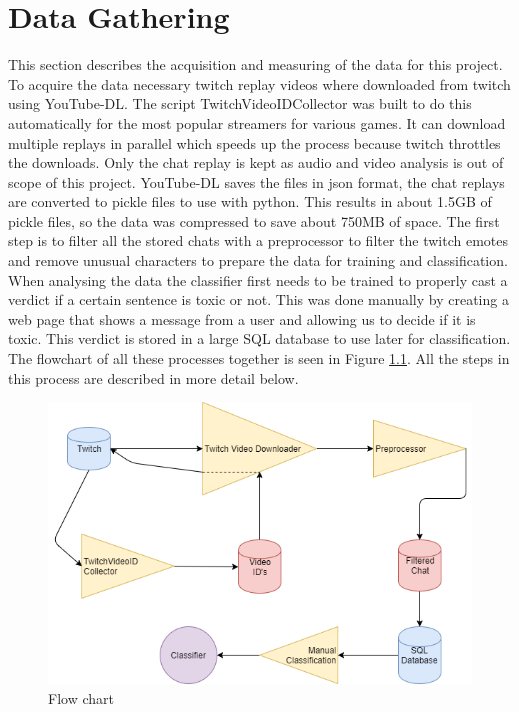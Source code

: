 \documentclass[final]{report}
\begin{document}
\chapter{Data Gathering}
\label{ch:datagathering}

This section describes the acquisition and measuring of the data for this project.
To acquire the data necessary twitch replay videos where downloaded from twitch using YouTube-DL.
The script TwitchVideoIDCollector was built to do this automatically for the most popular streamers for various games. 
It can download multiple replays in parallel which speeds up the process because twitch throttles the downloads.
Only the chat replay is kept as audio and video analysis is out of scope of this project.
YouTube-DL saves the files in json format, the chat replays are converted to pickle files to use with python. 
This results in about 1.5GB of pickle files, so the data was compressed to save about 750MB of space.
The first step is to filter all the stored chats with a preprocessor to filter the twitch emotes and remove unusual characters to prepare the data for training and classification.
When analysing the data the classifier first needs to be trained to properly cast a verdict if a certain sentence is toxic or not.
This was done manually by creating a web page that shows a message from a user and allowing us to decide if it is toxic. This verdict is stored in a large SQL database to use later for classification. 
The flowchart of all these processes together is seen in Figure \ref{fig:flowchart}. All the steps in this process are described in more detail below.


\begin{figure}[h]
	\includegraphics[width=\textwidth]{FlowChart.png}
	\caption{Flow chart}
	\label{fig:flowchart}
\end{figure}
\end{document}
